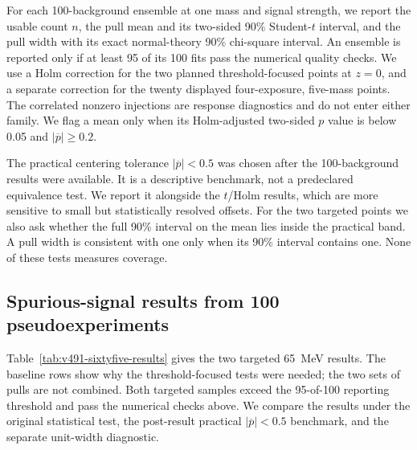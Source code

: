 For each 100-background ensemble at one mass and signal strength, we report the usable
count $n$, the pull mean and its two-sided 90\% Student-$t$ interval, and the pull width
with its exact normal-theory 90\% chi-square interval. An ensemble is reported only if
at least 95 of its 100 fits pass the numerical quality checks. We use a Holm correction for
the two planned threshold-focused points at $z=0$, and a separate correction for the
twenty displayed four-exposure, five-mass points. The correlated nonzero injections are
response diagnostics and do not enter either family. We flag a mean only when its
Holm-adjusted two-sided $p$ value is below 0.05 and $|\overline p|\geq0.2$.

The practical centering tolerance $|\overline p|<0.5$ was chosen after the
100-background results were available. It is a descriptive benchmark, not a
predeclared equivalence test. We report it alongside the $t$/Holm results, which are
more sensitive to small but statistically resolved offsets. For the two targeted
points we also ask whether the full 90\% interval on the mean lies inside the practical
band. A pull width is consistent with one only when its 90\% interval contains one.
None of these tests measures \CLs{} coverage.

\subsection{Spurious-signal results from 100 pseudoexperiments}
\label{sec:v491-spurious-signal}

Table~\ref{tab:v491-sixtyfive-results} gives the two targeted 65~MeV results. The
baseline rows show why the threshold-focused tests were needed; the two sets of pulls
are not combined. Both targeted samples exceed the 95-of-100 reporting
threshold and pass the numerical checks above.  We compare the results under the
original statistical test, the post-result practical
$|\overline p|<0.5$ benchmark, and the separate unit-width diagnostic.

